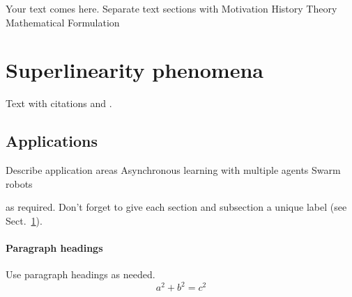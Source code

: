     
    
    Your text comes here. Separate text sections with
    Motivation
    History
    Theory
    Mathematical Formulation
    
    \section{Superlinearity phenomena}
    \label{sec:1}
    Text with citations \cite{RefB} and \cite{RefJ}.
    \subsection{Applications}
    \label{sec:2}
    Describe application areas
    Asynchronous learning with multiple agents
    Swarm robots
    
    as required. Don't forget to give each section
    and subsection a unique label (see Sect.~\ref{sec:1}).
    \paragraph{Paragraph headings} Use paragraph headings as needed.
    \begin{equation}
        a^2+b^2=c^2
    \end{equation}
    
